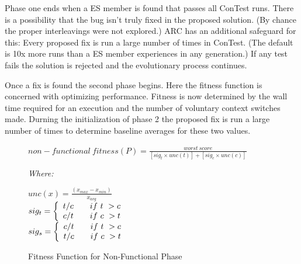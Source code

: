 \documentclass[10pt, conference, compsocconf]{IEEEtran}
\begin{document}
Phase one ends when a ES member is found that passes all ConTest runs. There is
a possibility that the bug isn't truly fixed in the proposed solution.  (By
chance the proper interleavings were not explored.)  ARC has an additional
safeguard for this:  Every proposed fix is run a large number of times in
ConTest. (The default is 10x more runs than a ES member experiences in any
generation.) If any test fails the solution is rejected and the evolutionary
process continues.

Once a fix is found the second phase begins.  Here the fitness function is
concerned with optimizing performance.  Fitness is now determined by the wall
time required for an execution and the number of voluntary context switches
made.  Durning the initialization of phase 2 the proposed fix is run a large
number of times to determine baseline averages for these two values.

\begin{figure}
\begin{footnotesize}
\begin{center}
$non-functional\ fitness(P) = \frac{worst\ score}{[sig_t \times unc(t)] + [sig_c \times unc(c)]}$
\end{center}
\vspace{0.1cm} \textit{Where:} \vspace{0.1cm}
\end{footnotesize}
\begin{tiny}
\begin{center}
$unc(x) = \frac{(x_{max} - x_{min})}{x_{avg}}$ \\ \vspace{0.2cm}
$
  sig_t = \left\{
  \begin{array}{l l}
    t/c & \quad if\ t\ > c \\
    c/t & \quad if\ c\ > t \\
  \end{array} \right.
$ \\ \vspace{0.2cm}
$
  sig_s = \left\{
  \begin{array}{l l}
    c/t & \quad if\ t\ > c \\
    t/c & \quad if\ c\ > t \\
  \end{array} \right.
$ \\
\end{center}
\end{tiny}
\caption{Fitness Function for Non-Functional Phase}
\label{fig:nonfunctional_fitness}
\end{figure}
\end{document}
